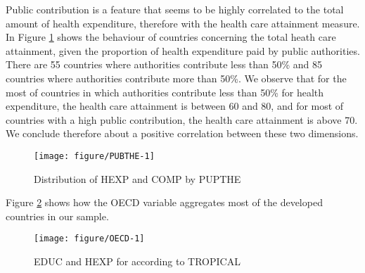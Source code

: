 \documentclass[12pt,a4paper]{article}\usepackage[]{graphicx}\usepackage[]{color}
\begin{document}
Public contribution is a feature that seems to be highly correlated to the total amount of health expenditure, therefore with the health care attainment measure. In Figure \ref{fig:PUBTHE} shows the behaviour of countries concerning the total heath care attainment, given the proportion of health expenditure paid by public authorities.  There are 55 countries where authorities contribute less than 50\% and 85 countries where authorities contribute more than 50\%. We observe that for the most of countries in which authorities contribute less than 50\% for health expenditure, the health care attainment is between 60 and 80, and for most of countries with a high public contribution, the health care attainment is above 70. We conclude therefore about a positive correlation between these two dimensions.
\begin{figure}[!htbp]

{\centering \texttt{[image: figure/PUBTHE-1]} 

}

\caption[Distribution of HEXP and COMP by PUPTHE]{Distribution of HEXP and COMP by PUPTHE}\label{fig:PUBTHE}
\end{figure}




Figure \ref{fig:OECD} shows how the OECD variable aggregates most of the developed countries in our sample.

\begin{figure}[!htbp]

{\centering \texttt{[image: figure/OECD-1]} 

}

\caption[EDUC and HEXP for according to TROPICAL]{EDUC and HEXP for according to TROPICAL}\label{fig:OECD}
\end{figure}
\end{document}
